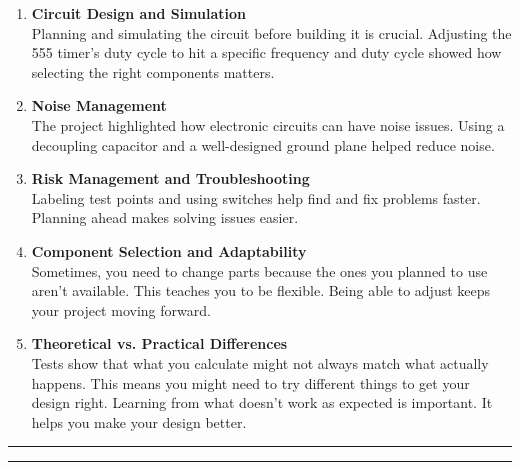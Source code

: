 \documentclass[a4paper,11pt]{article}%
\begin{document}
\begin{enumerate}
	\item \textbf{Circuit Design and Simulation}\\
	Planning and simulating the circuit before building it is crucial. Adjusting the 555 timer's duty cycle to hit a specific frequency and duty cycle showed how selecting the right components matters.
	\item \textbf{Noise Management}\\
	The project highlighted how electronic circuits can have noise issues. Using a decoupling capacitor and a well-designed ground plane helped reduce noise.
	\item \textbf{Risk Management and Troubleshooting}\\
	Labeling test points and using switches help find and fix problems faster.
	Planning ahead makes solving issues easier.
	\item \textbf{Component Selection and Adaptability}\\
	Sometimes, you need to change parts because the ones you planned to use aren't available. This teaches you to be flexible.
	Being able to adjust keeps your project moving forward.
	\item 
	\textbf{Theoretical vs. Practical Differences}\\
	Tests show that what you calculate might not always match what actually happens. This means you might need to try different things to get your design right.
	Learning from what doesn't work as expected is important. It helps you make your design better.
	
\end{enumerate}





\vfill
\hrule
\vspace{0.5cm}



\vspace{1cm}
\hrule
\vspace{0.5cm}


\end{document}
